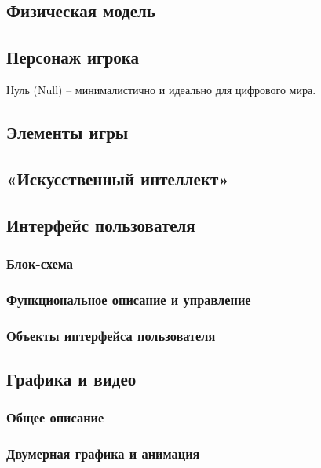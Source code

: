 \documentclass{article}
\begin{document}
\subsection{Физическая модель}

\subsection{Персонаж игрока}
Нуль (Null) – минималистично и идеально для цифрового мира.

\subsection{Элементы игры}

\subsection{«Искусственный интеллект»}

\subsection{Интерфейс пользователя}

\subsubsection{Блок-схема}

\subsubsection{Функциональное описание и управление}

\subsubsection{Объекты интерфейса пользователя}

\subsection{Графика и видео}

\subsubsection{Общее описание}

\subsubsection{Двумерная графика и анимация}
\end{document}
